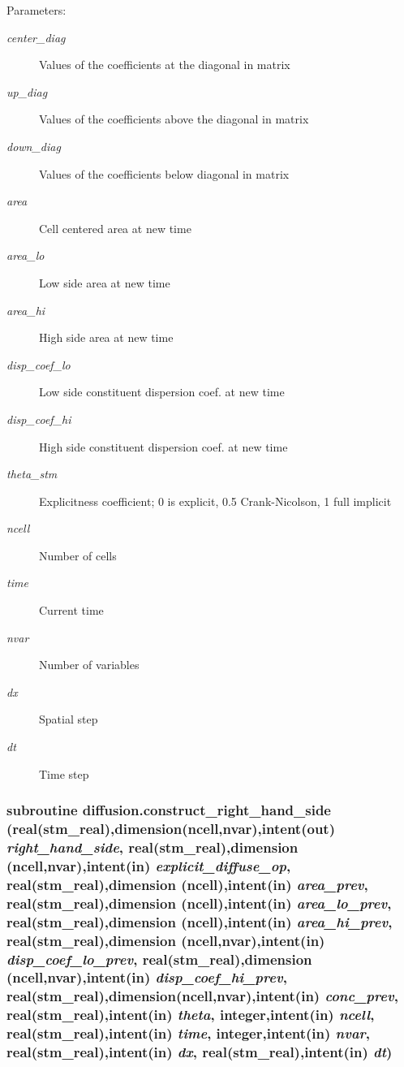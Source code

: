 \begin{Desc}
\item[Parameters:]
\begin{description}
\item[{\em center\_\-diag}]Values of the coefficients at the diagonal in matrix\item[{\em up\_\-diag}]Values of the coefficients above the diagonal in matrix\item[{\em down\_\-diag}]Values of the coefficients below diagonal in matrix\item[{\em area}]Cell centered area at new time \item[{\em area\_\-lo}]Low side area at new time\item[{\em area\_\-hi}]High side area at new time \item[{\em disp\_\-coef\_\-lo}]Low side constituent dispersion coef. at new time\item[{\em disp\_\-coef\_\-hi}]High side constituent dispersion coef. at new time\item[{\em theta\_\-stm}]Explicitness coefficient; 0 is explicit, 0.5 Crank-Nicolson, 1 full implicit \item[{\em ncell}]Number of cells\item[{\em time}]Current time\item[{\em nvar}]Number of variables\item[{\em dx}]Spatial step \item[{\em dt}]Time step \end{description}
\end{Desc}
\hypertarget{a00056_1b9df807b9c9eb3829821221f8933051}{
\subsubsection[{construct\_\-right\_\-hand\_\-side}]{\setlength{\rightskip}{0pt plus 5cm}subroutine diffusion.construct\_\-right\_\-hand\_\-side (real(stm\_\-real),dimension(ncell,nvar),intent(out) {\em right\_\-hand\_\-side}, \/  real(stm\_\-real),dimension (ncell,nvar),intent(in) {\em explicit\_\-diffuse\_\-op}, \/  real(stm\_\-real),dimension (ncell),intent(in) {\em area\_\-prev}, \/  real(stm\_\-real),dimension (ncell),intent(in) {\em area\_\-lo\_\-prev}, \/  real(stm\_\-real),dimension (ncell),intent(in) {\em area\_\-hi\_\-prev}, \/  real(stm\_\-real),dimension (ncell,nvar),intent(in) {\em disp\_\-coef\_\-lo\_\-prev}, \/  real(stm\_\-real),dimension (ncell,nvar),intent(in) {\em disp\_\-coef\_\-hi\_\-prev}, \/  real(stm\_\-real),dimension(ncell,nvar),intent(in) {\em conc\_\-prev}, \/  real(stm\_\-real),intent(in) {\em theta}, \/  integer,intent(in) {\em ncell}, \/  real(stm\_\-real),intent(in) {\em time}, \/  integer,intent(in) {\em nvar}, \/  real(stm\_\-real),intent(in) {\em dx}, \/  real(stm\_\-real),intent(in) {\em dt})}}
\label{a00056_1b9df807b9c9eb3829821221f8933051}


